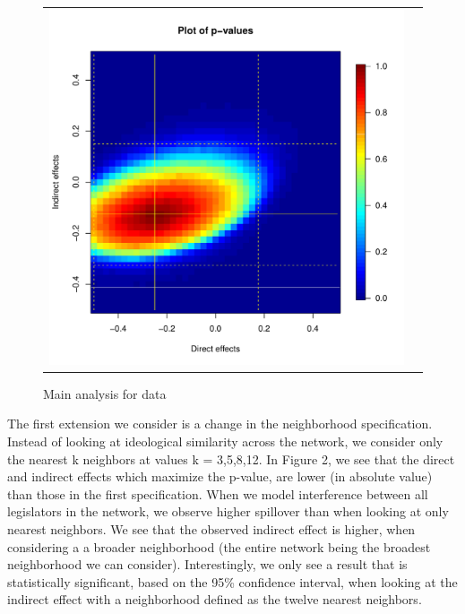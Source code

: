 \documentclass[12pt]{article}
\begin{document}
\begin{figure}
	\centering
	\begin{tabular}{cc}
	\includegraphics[scale=0.45]{./images/pval_plot_coppock_replication.pdf}
	\end{tabular}
	\caption{Main analysis for \citet{butler2011can} data}
\end{figure}


The first extension we consider is a change in the neighborhood specification. Instead of looking at ideological similarity across the network, we consider only the nearest k neighbors at values k = 3,5,8,12. In Figure 2, we see that the direct and indirect effects which maximize the p-value, are lower (in absolute value) than those in the first specification. When we model interference between all legislators in the network, we observe higher spillover than when looking at only nearest neighbors. We see that the observed indirect effect is higher, when considering a a broader neighborhood (the entire network being the broadest neighborhood we can consider). Interestingly, we only see a result that is statistically significant, based on the 95\% confidence interval, when looking at the indirect effect with a neighborhood defined as the twelve nearest neighbors. 
\end{document}
